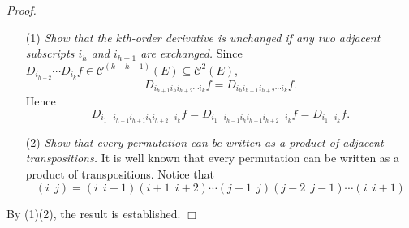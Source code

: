 \documentclass{article}
\begin{document}
\emph{Proof.}
\begin{enumerate}
\item[(1)]
  \emph{Show that the $k$th-order derivative is unchanged if
  any two adjacent subscripts $i_{h}$ and $i_{h+1}$ are exchanged.}
  Since $D_{i_{h+2}} \cdots D_{i_{k}} f \in \mathscr{C}^{(k-h-1)}(E)
  \subseteq \mathscr{C}^{2}(E)$,
  \[
    D_{i_{h+1} i_{h} i_{h+2} \cdots i_k} f
    = D_{i_{h} i_{h+1} i_{h+2} \cdots i_k} f.
  \]
  Hence
  \[
    D_{i_1 \cdots i_{h-1} i_{h+1} i_{h} i_{h+2} \cdots i_k} f
    = D_{i_1 \cdots i_{h-1} i_{h} i_{h+1} i_{h+2} \cdots i_k} f
    = D_{i_1 \cdots i_k} f.
  \]

\item[(2)]
  \emph{Show that every permutation can be written as a product of adjacent transpositions.}
  It is well known that
  every permutation can be written as a product of transpositions.
  Notice that
  \[
    (i \:\: j) = (i \:\: i+1)(i+1 \:\: i+2) \cdots
    (j-1 \:\: j)(j-2 \:\: j-1) \cdots (i \:\: i+1)
  \]
\end{enumerate}
By (1)(2), the result is established.
$\Box$ \\\\



\end{document}
